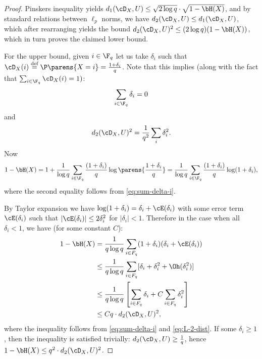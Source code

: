 \documentclass[11pt]{article}
\begin{document}
\begin{proof}
	Pinskers inequality \cite{pinsker64} yields $d_1(\cD_X, U) \leq \sqrt{2\log q} \cdot \sqrt{1 - \bH(X)}$, and by standard relations between $\ell_p$ norms, we have $d_2(\cD_X, U) \leq d_1(\cD_X, U)$, which after rearranging yields the bound $d_2(\cD_X, U)^2 \leq (2 \log q)(1 - \bH(X))$, which in turn proves the claimed lower bound.
	
	For the upper bound, given $i \in \F_q$ let us take $\delta_i$ such that $\cD_X(i) \stackrel{\text{def}}{=} \P\parens{X=i} = \frac{1 + \delta_i}{q}$. Note that this implies (along with the fact that $\sum_{i\in\F_q} \cD_X(i)=1)$:
	\begin{equation}
		\label{eq:sum-delta-i}
		\sum_{i \in \F_q} \delta_i = 0
	\end{equation} 
	and 
	\begin{equation}
		\label{eq:L-2-dist}
		d_2(\cD_X, U)^2 = \frac{1}{q^2} \sum_i \delta_i^2.
	\end{equation}
	Now
	\begin{equation*}
		1 - \bH(X) = 1+\frac{1}{\log q} \sum_{i \in \F_q}\frac{(1 + \delta_i)}{q} \log \parens{\frac{1 + \delta_i}q}=\frac{1}{\log q} \sum_{i \in \F_q} \frac{(1 + \delta_i)}{q} \log (1 + \delta_i),
	\end{equation*}
	where the second equality follows from \cref{eq:sum-delta-i}.

	
	By Taylor expansion we have $\log (1 + \delta_i) = \delta_i + \cE(\delta_i)$ with some error term $\cE(\delta_i)$ such that $|\cE(\delta_i)| \leq 2 \delta_i^2$ for $|\delta_i| < 1$. Therefore in the case when all $\delta_i < 1$, we have (for some constant $C$):
	\begin{align*}
		1 - \bH(X) & = \frac{1}{q \log q} \sum_{i \in F_q} (1 + \delta_i)(\delta_i + \cE(\delta_i)) \\
		& \leq \frac{1}{q \log q} \sum_{i \in F_q} [\delta_i + \delta_i^2 + \Oh(\delta_i^2)] \\
		& \leq \frac{1}{q \log q}\left[ \sum_{i \in F_q} \delta_i +  C \sum_{i \in F_q} \delta_i^2\right] \\
		& \leq C q \cdot d_2(\cD_X, U)^2,
	\end{align*}
	where the inequality follows from \cref{eq:sum-delta-i} and \cref{eq:L-2-dist}.
	If some $\delta_i \ge 1$, then the inequality is satisfied trivially: $d_2(\cD_X, U) \ge \frac{1}{q}$, hence $1 - \bH(X) \le q^2 \cdot d_2(\cD_X, U)^2$.
\end{proof}
\end{document}
